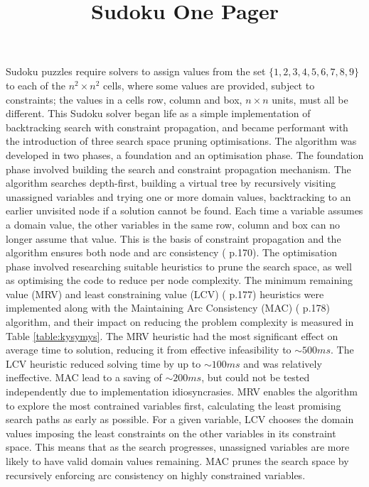\documentclass[twocolumn]{article}
\title{\vspace{-1.0cm}Sudoku One Pager\vspace{-1.0cm}}
\date{}
\begin{document}
\maketitle

Sudoku puzzles require solvers to assign values from the set $\{1,2,3,4,5,6,7,8,9\}$ to each of the $n^2\times n^2$ cells, where some values are provided, subject to constraints; the values in a cells row, column and box, $n\times n$ units, must all be different. This Sudoku solver began life as a simple implementation of backtracking search with constraint propagation, and became performant with the introduction of three search space pruning optimisations.
\newline
\newline
The algorithm was developed in two phases, a foundation and an optimisation phase. The foundation phase involved building the search and constraint propagation mechanism. The algorithm searches depth-first, building a virtual tree by recursively visiting unassigned variables and trying one or more domain values, backtracking to an earlier unvisited node if a solution cannot be found. Each time a variable assumes a domain value, the other variables in the same row, column and box can no longer assume that value. This is the basis of constraint propagation and the algorithm ensures both node and arc consistency (\cite{norvig} p.170).
\newline
\newline
The optimisation phase involved researching suitable heuristics to prune the search space, as well as optimising the code to reduce per node complexity. The minimum remaining value (MRV) and least constraining value (LCV) (\cite{norvig} p.177) heuristics were implemented along with the Maintaining Arc Consistency (MAC) (\cite{norvig} p.178) algorithm, and their impact on reducing the problem complexity is measured in Table \ref{table:kysymys}. 
\newline
\newline
The MRV heuristic had the most significant effect on average time to solution, reducing it from effective infeasibility to $\sim 500ms$. The LCV heuristic reduced solving time by up to $\sim 100ms$ and was relatively ineffective. MAC lead to a saving of $\sim 200ms$, but could not be tested independently due to implementation idiosyncrasies. MRV enables the algorithm to explore the most contrained variables first, calculating the least promising search paths as early as possible. For a given variable, LCV chooses the domain values imposing the least constraints on the other variables in its constraint space. This means that as the search progresses, unassigned variables are more likely to have valid domain values remaining. MAC prunes the search space by recursively enforcing arc consistency on highly constrained variables.
\end{document}
